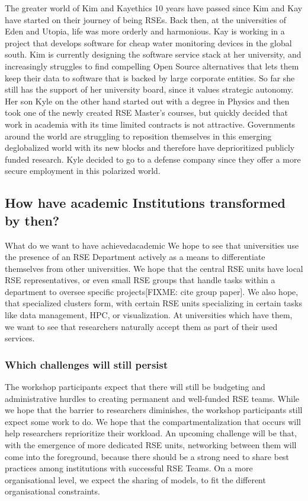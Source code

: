 \documentclass{eceasst}
\begin{document}
\begin{story}{The greater world of Kim and Kay}{ethics}
10 years have passed since Kim and Kay have started on their journey of being RSEs. Back then,
at the universities of Eden and Utopia, life was more orderly and harmonious. Kay is working in a project that develops
software for cheap water monitoring devices in the global south. Kim is currently designing the software service stack
at her university, and increasingly struggles to find compelling Open Source alternatives that lets them keep their data
to software that is backed by large corporate entities. So far she still has the support of her university board, since it values
strategic autonomy.
Her son Kyle on the other hand started out with a degree in Physics and then took one of the newly created RSE Master's courses,
but quickly decided that work in academia with its time limited contracts is not attractive.
Governments around the world are struggling to reposition themselves in this emerging deglobalized world with its new blocks
and therefore have deprioritized publicly funded research. Kyle decided to go to a defense company since they offer a
more secure employment in this polarized world.
\end{story}

\subsection{How have academic Institutions transformed by then?}
\begin{whatis}{What do we want to have achieved}{academic}
We hope to see that universities use the presence of an RSE Department actively as a means to differentiate themselves from other universities.
We hope that the central RSE units have local RSE representatives, or even small RSE groups that handle tasks within a department to oversee specific projects[FIXME: cite group paper].
We also hope, that specialized clusters form, with certain RSE units specializing in certain tasks like data management, HPC, or visualization.
At universities which have them, we want to see that researchers naturally accept them as part of their used services.
\end{whatis}

\subsubsection{Which challenges will still persist}
The workshop participants expect that there will still be budgeting and administrative hurdles to creating
permanent and well-funded RSE teams.
While we hope that the barrier to researchers diminishes, the workshop participants
still expect some work to do. We hope that the compartmentalization that occurs will help researchers reprioritize their workload.
An upcoming challenge will be that, with the emergence of more dedicated RSE units,
networking between them will come into the foreground, because there should be a strong need to share best practices
among institutions with successful RSE Teams.
On a more organisational level, we expect the sharing of models, to fit the different organisational constraints.
\end{document}
